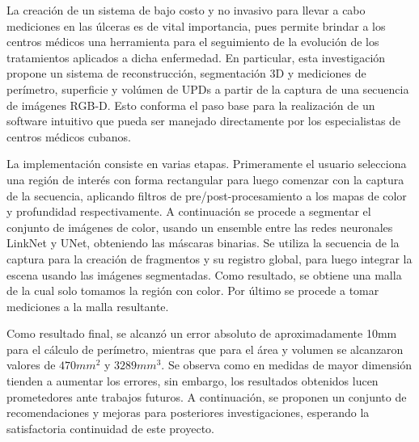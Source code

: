 \begin{conclusions}

La creación de un sistema de bajo costo y no invasivo para llevar a cabo mediciones en las úlceras es de vital importancia, pues permite brindar a los centros médicos una herramienta para el seguimiento de la evolución de los tratamientos aplicados a dicha enfermedad. En particular, esta investigación propone un sistema de reconstrucción, segmentación 3D y mediciones de perímetro, superficie y volúmen de UPDs a partir de la captura de una secuencia de imágenes RGB-D. Esto conforma el paso base para la realización de un software intuitivo que pueda ser manejado directamente por los especialistas de centros médicos cubanos.

La implementación consiste en varias etapas. Primeramente el usuario selecciona una región de interés con forma rectangular para luego comenzar con la captura de la secuencia, aplicando filtros de pre/post-procesamiento a los mapas de color y profundidad respectivamente. A continuación se procede a segmentar el conjunto de imágenes de color, usando un ensemble entre las redes neuronales LinkNet y UNet, obteniendo las máscaras binarias. Se utiliza la secuencia de la captura para la creación de fragmentos y su registro global, para luego integrar la escena usando las imágenes segmentadas. Como resultado, se obtiene una malla de la cual solo tomamos la región con color. Por último se procede a tomar mediciones a la malla resultante.

Como resultado final, se alcanzó un error absoluto de aproximadamente 10mm para el cálculo de perímetro, mientras que para el área y volumen se alcanzaron valores de $470mm^2$ y $3289mm^3$. Se observa como en medidas de mayor dimensión tienden a aumentar los errores, sin embargo, los resultados obtenidos lucen prometedores ante trabajos futuros. A continuación, se proponen un conjunto de recomendaciones y mejoras para posteriores investigaciones, esperando la satisfactoria continuidad de este proyecto.
\end{conclusions}
